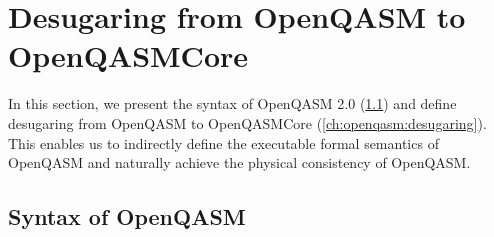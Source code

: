 
\chapter{Desugaring from OpenQASM to OpenQASMCore}
\label{ch:openqasm}

\noindent
In this section, we present the syntax of OpenQASM 2.0
(\cref{ch:openqasm:syntax}) and define desugaring from OpenQASM to
OpenQASMCore (\cref{ch:openqasm:desugaring}).
%
This enables us to indirectly define the executable formal semantics of
OpenQASM and naturally achieve the physical consistency of OpenQASM.

\section{Syntax of OpenQASM}
\label{ch:openqasm:syntax}


